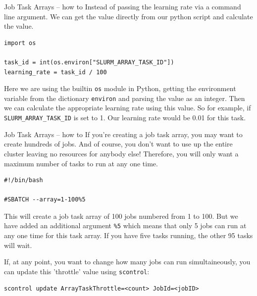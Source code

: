 \documentclass[10pt]{beamer}
\begin{document}
\begin{frame}[label={sec:org47ba789},fragile]{Job Task Arrays -- how to}
 Instead of passing the learning rate via a command line argument. We can get the
value directly from our python script and calculate the value.

\begin{verbatim}
import os

task_id = int(os.environ["SLURM_ARRAY_TASK_ID"])
learning_rate = task_id / 100
\end{verbatim}

Here we are using the builtin \texttt{os} module in Python, getting the environment
variable from the dictionary \texttt{environ} and parsing the value as an integer. Then
we can calculate the appropriate learning rate using this value. So for example,
if \texttt{SLURM\_ARRAY\_TASK\_ID} is set to 1. Our learning rate would be 0.01 for this
task.
\end{frame}

\begin{frame}[label={sec:org86e54cd},fragile]{Job Task Arrays -- how to}
 If you're creating a job task array, you may want to create hundreds of
jobs. And of course, you don't want to use up the entire cluster leaving no
resources for anybody else! Therefore, you will only want a maximum number of
tasks to run at any one time.

\begin{verbatim}
#!/bin/bash

#SBATCH --array=1-100%5
\end{verbatim}

This will create a job task array of 100 jobs numbered from 1 to 100. But we
have added an additional argument \texttt{\%5} which means that only 5 jobs can run at any
one time for this task array. If you have five tasks running, the other 95 tasks
will wait.

If, at any point, you want to change how many jobs can run simultaineously, you
can update this 'throttle' value using \texttt{scontrol}:

\begin{verbatim}
scontrol update ArrayTaskThrottle=<count> JobId=<jobID>
\end{verbatim}
\end{frame}
\end{document}

